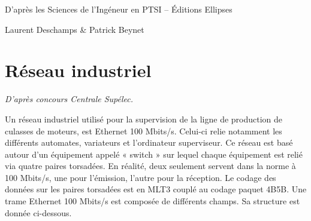 \documentclass[10pt]{article}
\begin{document}


%
%
%
%
%

\begin{center}
D'après les Sciences de l'Ingéneur en PTSI -- Éditions Ellipses

Laurent Deschamps \& Patrick Beynet
\end{center}

\section{Réseau industriel}
\begin{flushright}
\textit{D’après concours Centrale Supélec.}
\end{flushright}

Un réseau industriel utilisé pour la supervision de la ligne de production de culasses de moteurs, est Ethernet 100 Mbits/s. Celui-ci relie notamment les différents automates, variateurs et l'ordinateur superviseur. Ce réseau est basé autour d’un équipement appelé « switch » sur lequel chaque équipement est relié via quatre paires torsadées. En réalité, deux seulement servent dans la norme à 100 Mbits/s, une pour l’émission, l’autre pour la réception. Le codage des données sur les paires torsadées est en MLT3 couplé au codage paquet 4B5B. Une trame Ethernet 100 Mbits/s est composée de différents champs. Sa structure est donnée ci-dessous.
\end{document}
